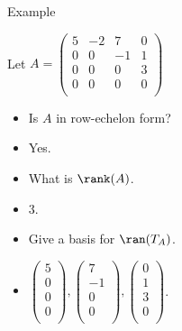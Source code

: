 \documentclass{beamer}
\begin{document}
\begin{frame}{Example}

Let
$
A=
\begin{pmatrix}
5 & -2 &  7  & 0 \\
0 & 0  & -1  & 1 \\
0 & 0  &  0  & 3 \\
0 & 0  &  0  & 0 \\
\end{pmatrix}
$
\begin{itemize}
\item Is $A$ in row-echelon form?
\item Yes.
\item What is $\rank(A)$.
\item 3.
\item Give a basis for $\ran(T_A)$.
\item
$
\begin{pmatrix}
5 \\
0 \\
0 \\
0 \\
\end{pmatrix},
\begin{pmatrix}
 7 \\
-1 \\
 0 \\
 0 \\
\end{pmatrix},
\begin{pmatrix}
0 \\
1 \\
3 \\
0 \\
\end{pmatrix}
$.
\end{itemize}

\end{frame}
\end{document}
